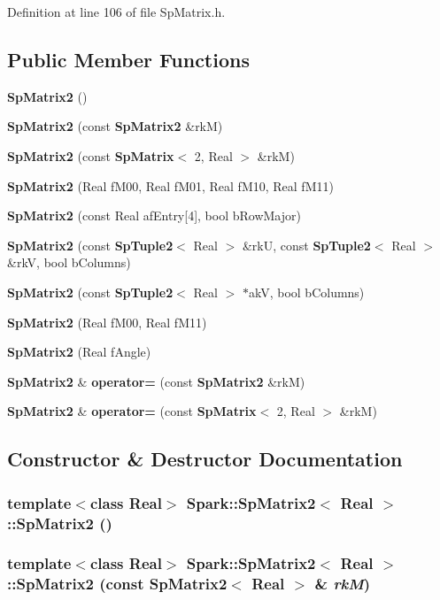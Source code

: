 Definition at line 106 of file Sp\-Matrix.h.\subsection*{Public Member Functions}
\begin{CompactItemize}
\item 
{\bf Sp\-Matrix2} ()
\item 
{\bf Sp\-Matrix2} (const {\bf Sp\-Matrix2} \&rk\-M)
\item 
{\bf Sp\-Matrix2} (const {\bf Sp\-Matrix}$<$ 2, Real $>$ \&rk\-M)
\item 
{\bf Sp\-Matrix2} (Real f\-M00, Real f\-M01, Real f\-M10, Real f\-M11)
\item 
{\bf Sp\-Matrix2} (const Real af\-Entry[4], bool b\-Row\-Major)
\item 
{\bf Sp\-Matrix2} (const {\bf Sp\-Tuple2}$<$ Real $>$ \&rk\-U, const {\bf Sp\-Tuple2}$<$ Real $>$ \&rk\-V, bool b\-Columns)
\item 
{\bf Sp\-Matrix2} (const {\bf Sp\-Tuple2}$<$ Real $>$ $\ast$ak\-V, bool b\-Columns)
\item 
{\bf Sp\-Matrix2} (Real f\-M00, Real f\-M11)
\item 
{\bf Sp\-Matrix2} (Real f\-Angle)
\item 
{\bf Sp\-Matrix2} \& {\bf operator=} (const {\bf Sp\-Matrix2} \&rk\-M)
\item 
{\bf Sp\-Matrix2} \& {\bf operator=} (const {\bf Sp\-Matrix}$<$ 2, Real $>$ \&rk\-M)
\end{CompactItemize}


\subsection{Constructor \& Destructor Documentation}
\subsubsection{\setlength{\rightskip}{0pt plus 5cm}template$<$class Real$>$ {\bf Spark::Sp\-Matrix2}$<$ Real $>$::{\bf Sp\-Matrix2} ()}\label{classSpark_1_1SpMatrix2_a0}


\subsubsection{\setlength{\rightskip}{0pt plus 5cm}template$<$class Real$>$ {\bf Spark::Sp\-Matrix2}$<$ Real $>$::{\bf Sp\-Matrix2} (const {\bf Sp\-Matrix2}$<$ Real $>$ \& {\em rk\-M})}\label{classSpark_1_1SpMatrix2_a1}


